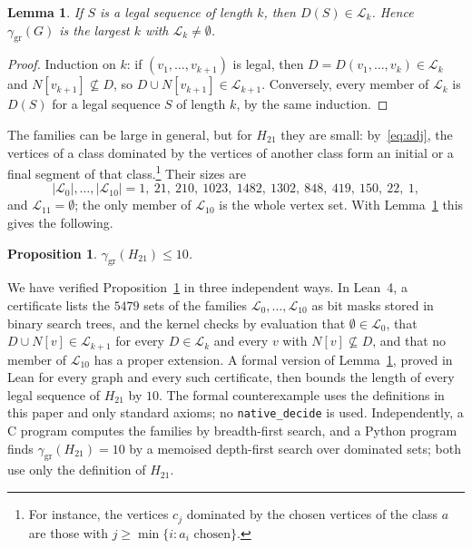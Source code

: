 \documentclass[screen]{aomart}
\newtheorem{proposition}[theorem]{Proposition}
\newtheorem{lemma}[theorem]{Lemma}
\theoremstyle{definition}
\theoremstyle{remark}
\numberwithin{equation}{section}
\newcommand{\ggr}{\gamma_{\mathrm{gr}}}
\begin{document}
\begin{lemma}\label{lem:layers}
If $S$ is a legal sequence of length $k$, then $D(S)\in\mathcal L_k$. Hence $\ggr(G)$ is the largest $k$ with $\mathcal L_k\neq\emptyset$.
\end{lemma}

\begin{proof}
Induction on $k$: if $(v_1,\dots,v_{k+1})$ is legal, then $D=D(v_1,\dots,v_k)\in\mathcal L_k$ and $N[v_{k+1}]\not\subseteq D$, so $D\cup N[v_{k+1}]\in\mathcal L_{k+1}$. Conversely, every member of $\mathcal L_k$ is $D(S)$ for a legal sequence $S$ of length $k$, by the same induction.
\end{proof}

The families can be large in general, but for $H_{21}$ they are small: by~\eqref{eq:adj}, the vertices of a class dominated by the vertices of another class form an initial or a final segment of that class.\footnote{For instance, the vertices $c_j$ dominated by the chosen vertices of the class $a$ are those with $j\ge\min\{i: a_i\text{ chosen}\}$.} Their sizes are
\[
  |\mathcal L_0|,\dots,|\mathcal L_{10}| = 1,\ 21,\ 210,\ 1023,\ 1482,\ 1302,\ 848,\ 419,\ 150,\ 22,\ 1,
\]
and $\mathcal L_{11}=\emptyset$; the only member of $\mathcal L_{10}$ is the whole vertex set. With Lemma~\ref{lem:layers} this gives the following.

\begin{proposition}\label{prop:h21upper}
$\ggr(H_{21})\le10$.
\end{proposition}

We have verified Proposition~\ref{prop:h21upper} in three independent ways. In Lean~4, a certificate lists the $5479$ sets of the families $\mathcal L_0,\dots,\mathcal L_{10}$ as bit masks stored in binary search trees, and the kernel checks by evaluation that $\emptyset\in\mathcal L_0$, that $D\cup N[v]\in\mathcal L_{k+1}$ for every $D\in\mathcal L_k$ and every $v$ with $N[v]\not\subseteq D$, and that no member of $\mathcal L_{10}$ has a proper extension. A formal version of Lemma~\ref{lem:layers}, proved in Lean for every graph and every such certificate, then bounds the length of every legal sequence of $H_{21}$ by $10$. The formal counterexample uses the definitions in this paper and only standard axioms; no \texttt{native\_decide} is used. Independently, a C program computes the families by breadth-first search, and a Python program finds $\ggr(H_{21})=10$ by a memoised depth-first search over dominated sets; both use only the definition of $H_{21}$.
\end{document}

